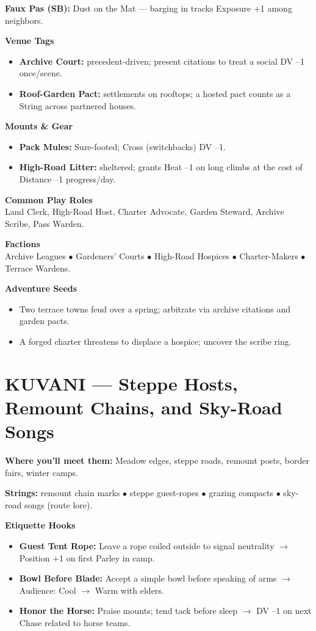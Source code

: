 \documentclass[11pt]{article}
\begin{document}
\textbf{Faux Pas (SB):} Dust on the Mat --- barging in tracks Exposure +1 among neighbors.

\textbf{Venue Tags}
\begin{itemize}
\item \textbf{Archive Court:} precedent-driven; present citations to treat a social DV --1 once/scene.
\item \textbf{Roof-Garden Pact:} settlements on rooftops; a hosted pact counts as a String across partnered houses.
\end{itemize}

\textbf{Mounts \& Gear}
\begin{itemize}
\item \textbf{Pack Mules:} Sure-footed; Cross (switchbacks) DV --1.
\item \textbf{High-Road Litter:} sheltered; grants Heat --1 on long climbs at the cost of Distance --1 progress/day.
\end{itemize}

\textbf{Common Play Roles}\\
Land Clerk, High-Road Host, Charter Advocate, Garden Steward, Archive Scribe, Pass Warden.

\textbf{Factions}\\
Archive Leagues $\bullet$ Gardeners' Courts $\bullet$ High-Road Hospices $\bullet$ Charter-Makers $\bullet$ Terrace Wardens.

\textbf{Adventure Seeds}
\begin{itemize}
\item Two terrace towns feud over a spring; arbitrate via archive citations and garden pacts.
\item A forged charter threatens to displace a hospice; uncover the scribe ring.
\end{itemize}

\section*{KUVANI --- Steppe Hosts, Remount Chains, and Sky-Road Songs}

\textbf{Where you'll meet them:} Meadow edges, steppe roads, remount posts, border fairs, winter camps.

\textbf{Strings:} remount chain marks $\bullet$ steppe guest-ropes $\bullet$ grazing compacts $\bullet$ sky-road songs (route lore).

\textbf{Etiquette Hooks}
\begin{itemize}
\item \textbf{Guest Tent Rope:} Leave a rope coiled outside to signal neutrality $\rightarrow$ Position +1 on first Parley in camp.
\item \textbf{Bowl Before Blade:} Accept a simple bowl before speaking of arms $\rightarrow$ Audience: Cool $\rightarrow$ Warm with elders.
\item \textbf{Honor the Horse:} Praise mounts; tend tack before sleep $\rightarrow$ DV --1 on next Chase related to horse teams.
\end{itemize}
\end{document}
